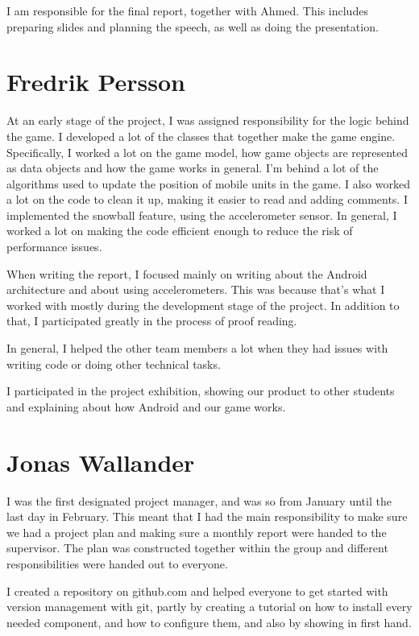 I am responsible for the final report, together with Ahmed. This includes preparing slides and planning the speech, as well as doing the presentation.


\section{Fredrik Persson}

At an early stage of the project, I was assigned responsibility for the logic behind the game. I developed a lot of the classes that together make the game engine. Specifically, I worked a lot on the game model, how game objects are represented as data objects and how the game works in general. I'm behind a lot of the algorithms used to update the position of mobile units in the game. I also worked a lot on the code to clean it up, making it easier to read and adding comments. I implemented the snowball feature, using the accelerometer sensor. In general, I worked a lot on making the code efficient enough to reduce the risk of performance issues.

When writing the report, I focused mainly on writing about the Android architecture and about using accelerometers. This was because that's what I worked with mostly during the development stage of the project. In addition to that, I participated greatly in the process of proof reading.

In general, I helped the other team members a lot when they had issues with writing code or doing other technical tasks. 

I participated in the project exhibition, showing our product to other students and explaining about how Android  and our game works.


\section{Jonas Wallander}

I was the first designated project manager, and was so from January until the last day in February. This meant that I had the main responsibility to make sure we had a project plan and making sure a monthly report were handed to the supervisor. The plan was constructed together within the group and different responsibilities were handed out to everyone.

I created a repository on github.com and helped everyone to get started with version management with git, partly by creating a tutorial on how to install every needed component, and how to configure them, and also by showing in first hand.

